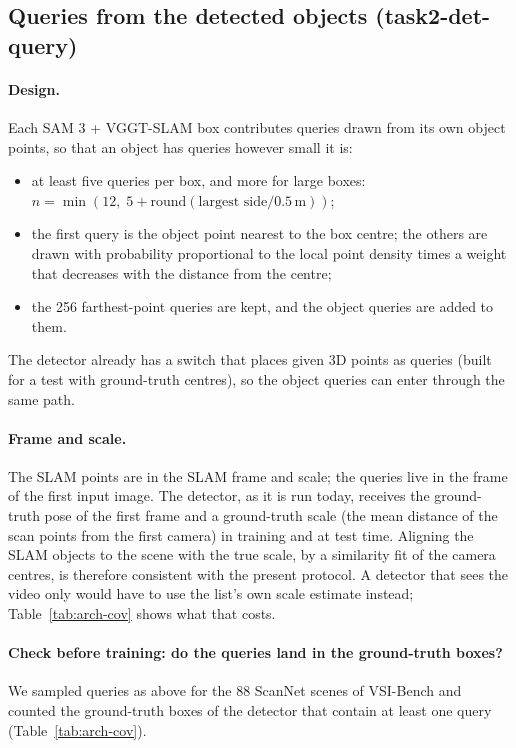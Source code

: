 \subsection{Queries from the detected objects (task2-det-query)}
\label{sec:vggtdet-arch-query}

\paragraph{Design.}
Each SAM 3 + VGGT-SLAM box contributes queries drawn from its own object points, so that an object has queries
however small it is:
\begin{itemize}
\item at least five queries per box, and more for large boxes:
      $n = \min(12,\; 5 + \mathrm{round}(\text{largest side} / 0.5\,\mathrm{m}))$;
\item the first query is the object point nearest to the box centre; the others are drawn with probability
      proportional to the local point density times a weight that decreases with the distance from the centre;
\item the 256 farthest-point queries are kept, and the object queries are added to them.
\end{itemize}
The detector already has a switch that places given 3D points as queries (built for a test with ground-truth
centres), so the object queries can enter through the same path.

\paragraph{Frame and scale.}
The SLAM points are in the SLAM frame and scale; the queries live in the frame of the first input image.
The detector, as it is run today, receives the ground-truth pose of the first frame and a ground-truth scale
(the mean distance of the scan points from the first camera) in training and at test time. Aligning the SLAM
objects to the scene with the true scale, by a similarity fit of the camera centres, is therefore consistent
with the present protocol. A detector that sees the video only would have to use the list's own scale estimate
instead; Table~\ref{tab:arch-cov} shows what that costs.

\paragraph{Check before training: do the queries land in the ground-truth boxes?}
We sampled queries as above for the 88 ScanNet scenes of VSI-Bench and counted the ground-truth boxes of the
detector that contain at least one query (Table~\ref{tab:arch-cov}).

